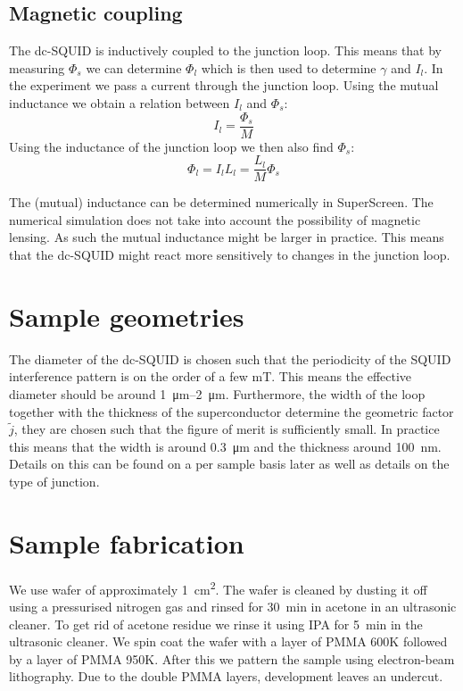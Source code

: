 \subsection{Magnetic coupling}
\label{sec:magnetic-coupling}
The dc-SQUID is inductively coupled to the junction loop. This means that by measuring $\Phi_s$ we can determine $\Phi_l$ which is then used to determine $\gamma$ and $I_l$. In the experiment we pass a current through the junction loop. Using the mutual inductance we obtain a relation between $I_l$ and $\Phi_s$:
\begin{equation}
	I_l = \frac{\Phi_s}{M}
\end{equation}
Using the inductance of the junction loop we then also find $\Phi_s$:
\begin{equation}
	\Phi_l = I_lL_l = \frac{L_l}{M}\Phi_s
\end{equation}

The (mutual) inductance can be determined numerically in SuperScreen\cite{bishop-vanhornSuperScreenOpensourcePackage2022}. The numerical simulation does not take into account the possibility of magnetic lensing\cite{prigozhin3DSimulationSuperconducting2018}. As such the mutual inductance might be larger in practice. This means that the dc-SQUID might react more sensitively to changes in the junction loop.

\section{Sample geometries}
The diameter of the dc-SQUID is chosen such that the periodicity of the SQUID interference pattern is on the order of a few \unit{\milli\tesla}. This means the effective diameter should be around \qtyrange{1}{2}{\micro\meter}. Furthermore, the width of the loop together with the thickness of the superconductor determine the geometric factor $\tilde{j}$, they are chosen such that the figure of merit is sufficiently small. In practice this means that the width is around \qty{0.3}{\micro\meter} and the thickness around \qty{100}{\nano\meter}. Details on this can be found on a per sample basis later as well as details on the type of junction.

\section{Sample fabrication}
\label{sec:method-sample-fabrication}
We use  wafer of approximately \qty{1}{\square\centi\meter}. The wafer is cleaned by dusting it off using a pressurised nitrogen gas and rinsed for \qty{30}{\minute} in acetone in an ultrasonic cleaner. To get rid of acetone residue we rinse it using IPA for \qty{5}{\minute} in the ultrasonic cleaner. We spin coat the wafer with a layer of PMMA 600K followed by a layer of PMMA 950K. After this we pattern the sample using electron-beam lithography. Due to the double PMMA layers, development leaves an undercut.

